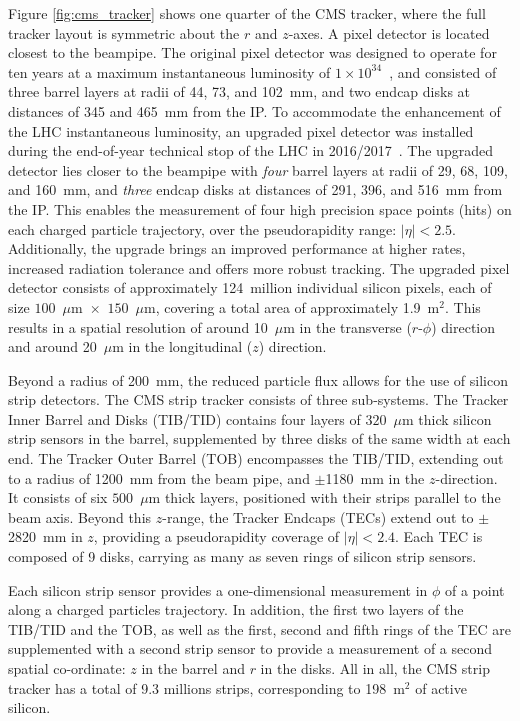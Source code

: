 Figure \ref{fig:cms_tracker} shows one quarter of the CMS tracker, where the full tracker layout is symmetric about the $r$ and $z$-axes. A pixel detector is located closest to the beampipe. The original pixel detector was designed to operate for ten years at a maximum instantaneous luminosity of $1\times10^{34}$~\lumi, and consisted of three barrel layers at radii of 44, 73, and 102~mm, and two endcap disks at distances of 345 and 465~mm from the IP. To accommodate the enhancement of the LHC instantaneous luminosity, an upgraded pixel detector was installed during the end-of-year technical stop of the LHC in 2016/2017~\cite{CMS:2012sda}. The upgraded detector lies closer to the beampipe with \textit{four} barrel layers at radii of 29, 68, 109, and 160~mm, and \textit{three} endcap disks at distances of 291, 396, and 516~mm from the IP. This enables the measurement of four high precision space points (hits) on each charged particle trajectory, over the pseudorapidity range: $|\eta|<2.5$. Additionally, the upgrade brings an improved performance at higher rates, increased radiation tolerance and offers more robust tracking. The upgraded pixel detector consists of approximately 124~million individual silicon pixels, each of size $100$~$\mu$m~$\times$~$150$~$\mu$m, covering a total area of approximately 1.9~m$^2$. This results in a spatial resolution of around 10~$\mu$m in the transverse ($r$-$\phi$) direction and around 20~$\mu$m in the longitudinal ($z$) direction.

Beyond a radius of 200~mm, the reduced particle flux allows for the use of silicon strip detectors. The CMS strip tracker consists of three sub-systems. The Tracker Inner Barrel and Disks (TIB/TID) contains four layers of $320$~$\mu$m thick silicon strip sensors in the barrel, supplemented by three disks of the same width at each end. The Tracker Outer Barrel (TOB) encompasses the TIB/TID, extending out to a radius of 1200~mm from the beam pipe, and $\pm$1180~mm in the $z$-direction. It consists of six $500$~$\mu$m thick layers, positioned with their strips parallel to the beam axis. Beyond this $z$-range, the Tracker Endcaps (TECs) extend out to $\pm$2820~mm in $z$, providing a pseudorapidity coverage of $|\eta|<2.4$. Each TEC is composed of 9 disks, carrying as many as seven rings of silicon strip sensors. 

Each silicon strip sensor provides a one-dimensional measurement in $\phi$ of a point along a charged particles trajectory. In addition, the first two layers of the TIB/TID and the TOB, as well as the first, second and fifth rings of the TEC are supplemented with a second strip sensor to provide a measurement of a second spatial co-ordinate: $z$ in the barrel and $r$ in the disks. All in all, the CMS strip tracker has a total of 9.3 millions strips, corresponding to 198~m$^2$ of active silicon.

